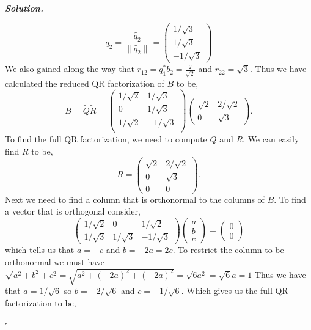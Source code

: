 \documentclass[12pt]{report}
\newenvironment{solution}[1][\it{Solution}]{\textbf{#1. } }{$\square$}
\begin{document}
\begin{solution}
\begin{enumerate}
        \[
            q_2 = \frac{\tilde{q_2}}{\|\tilde{q_2}\|} = \begin{pmatrix}
                1/\sqrt{3}\\ 1/\sqrt{3}\\ -1/\sqrt{3}
            \end{pmatrix}
        \]
        We also gained along the way that $r_{12} = q_1^*b_2 = \frac{2}{\sqrt{2}}$ and $r_{22} = \sqrt{3}$. Thus we have calculated the reduced QR factorization of $B$ to be,
        \[
            B = \tilde{Q}\tilde{R} = \begin{pmatrix}
                1/ \sqrt{2} & 1/ \sqrt{3}\\
                0 & 1/\sqrt{3}\\
                1/\sqrt{2} & -1/\sqrt{3}\\
            \end{pmatrix}\begin{pmatrix}
                \sqrt{2} & 2/\sqrt{2}\\
                0 & \sqrt{3}
            \end{pmatrix}.
        \]
        To find the full QR factorization, we need to compute $Q$ and $R$. We can easily find $R$ to be,
        \[
            R = \begin{pmatrix}
                \sqrt{2} & 2/\sqrt{2}\\
                0 & \sqrt{3}\\
                0&0
            \end{pmatrix}.
        \]
        Next we need to find a column that is orthonormal to the columns of $B$. To find a vector that is orthogonal consider, 
        \[
            \begin{pmatrix}
                1/\sqrt{2} & 0 & 1/\sqrt{2}\\
                1/\sqrt{3} & 1/\sqrt{3} & -1/\sqrt{3}
            \end{pmatrix}\begin{pmatrix}
                a\\b\\c
            \end{pmatrix} = \begin{pmatrix}
                0\\0
            \end{pmatrix}
        \]
        which tells us that $a = -c$ and $b =-2a = 2c$. To restrict the column to be orthonormal we must have $\sqrt{a^2 + b^2 + c^2} = \sqrt{a^2 + (-2a)^2 + (-2a)^2} = \sqrt{6a^2} = \sqrt{6}a=1$ Thus we have that $a = 1 / \sqrt{6}$ so $b = -2 / \sqrt{6}$ and $c = - 1/\sqrt{6}$. Which gives us the full QR factorization to be,

\end{enumerate}
\end{solution}
\end{document}
